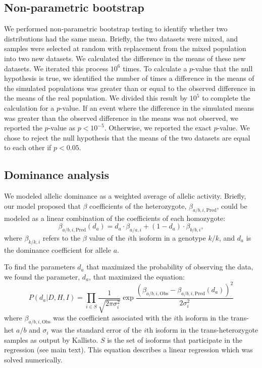 \documentclass[10pt, onecolumn]{article}
\begin{document}
\subsection*{Non-parametric bootstrap}
We performed non-parametric bootstrap testing to identify whether two
distributions had the same mean. Briefly, the two datasets were mixed, and
samples were selected at random with replacement from the mixed population into
two new datasets. We calculated the difference in the means of these new
datasets. We iterated this process $10^6$ times. To calculate a $p$-value that the
null hypothesis is true, we identified the number of times a difference in the
means of the simulated populations was greater than or equal to the observed
difference in the means of the real population. We divided this result by $10^5$
to complete the calculation for a $p$-value. If an event where the difference in
the simulated means was greater than the observed difference in the means was
not observed, we reported the $p$-value as $p<10^{-5}$. Otherwise, we reported the
exact $p$-value. We chose to reject the null hypothesis that the means of the two
datasets are equal to each other if $p < 0.05$.

\subsection*{Dominance analysis}
We modeled allelic dominance as a weighted average of allelic activity. Briefly,
our model proposed that $\beta$ coefficients of the heterozygote,
$\beta_{a/b,i,\text{Pred}}$, could be modeled as a linear combination of the
coefficients of each homozygote:
\begin{equation}
  \beta_{a/b,i,\text{Pred}}(d_a) = d_a\cdot \beta_{a/a,i} + (1-d_a)\cdot \beta_{b/b,i},
\end{equation}
where $\beta_{k/k, i}$ refers to the $\beta$ value of the $i$th isoform in a
genotype $k/k$, and $d_a$ is the dominance coefficient for allele $a$.

To find the parameters $d_a$ that maximized the probability of observing the
data, we found the parameter, $d_a$, that maximized the equation:
\begin{equation}
    P(d_a|D,H,I) = \prod_{i \in S}\frac{1}{\sqrt{2\pi \sigma_i^2}}
                   \exp{\frac{{(\beta_{a/b,i,\text{Obs}} -
                                \beta_{a/b,i,\text{Pred}}(d_a))}^2}{
                                2\sigma_i^2}}
\end{equation}
where $\beta_{a/b,i,\text{Obs}}$ was the coefficient associated with the $i$th
isoform in the trans-het $a/b$ and $\sigma_i$ was the standard error of the
$i$th isoform in the trans-heterozygote samples as output by Kallisto. $S$ is
the set of isoforms that participate in the regression (see main text). This
equation describes a linear regression which was solved numerically.
\end{document}
